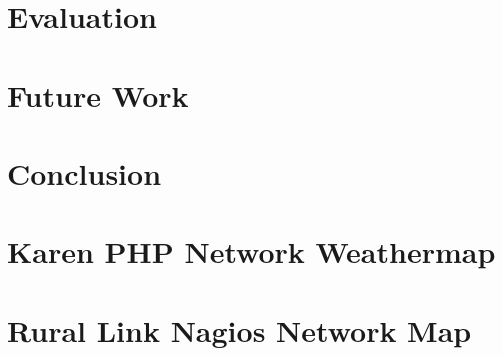 \documentclass[11pt, a4paper]{article}
\begin{document}
\section{Evaluation}
\label{sec:evaluation}

\section{Future Work}
\label{sec:future-work}

\section{Conclusion}
\label{sec:conclusion}




\appendix
\appendixpage

\section{Karen PHP Network Weathermap}
\label{app:karenphp}

\section{Rural Link Nagios Network Map}
\label{app:crcnetnagios}
\end{document}
